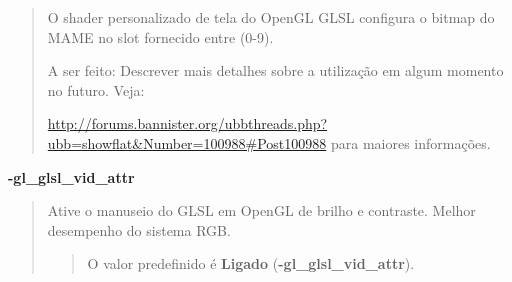 \documentclass[letterpaper,10pt,brazil]{sphinxmanual}
\begin{document}
\begin{quote}

O shader personalizado de tela do OpenGL GLSL configura o bitmap do
MAME no slot fornecido entre (0-9).

A ser feito: Descrever mais detalhes sobre a utilização em algum
momento no futuro. Veja:

\url{http://forums.bannister.org/ubbthreads.php?ubb=showflat\&Number=100988\#Post100988} para maiores informações.
\end{quote}
\label{commandline/commandline-all:mame-commandline-glglslvidattr}
\textbf{-gl\_glsl\_vid\_attr}
\begin{quote}

Ative o manuseio do GLSL em OpenGL de brilho e contraste.
Melhor desempenho do sistema RGB.
\begin{quote}

O valor predefinido é \textbf{Ligado} (\textbf{-gl\_glsl\_vid\_attr}).
\end{quote}
\end{quote}
\end{document}
